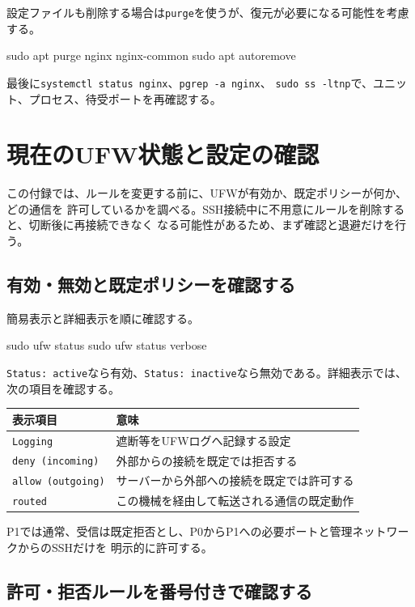 \documentclass[uplatex,a4paper,11pt]{jsarticle}
\begin{document}
設定ファイルも削除する場合は\texttt{purge}を使うが、復元が必要になる可能性を考慮する。

\begin{command}
sudo apt purge nginx nginx-common
sudo apt autoremove
\end{command}

最後に\texttt{systemctl status nginx}、\texttt{pgrep -a nginx}、
\texttt{sudo ss -ltnp}で、ユニット、プロセス、待受ポートを再確認する。

\section{現在のUFW状態と設定の確認}

この付録では、ルールを変更する前に、UFWが有効か、既定ポリシーが何か、どの通信を
許可しているかを調べる。SSH接続中に不用意にルールを削除すると、切断後に再接続できなく
なる可能性があるため、まず確認と退避だけを行う。

\subsection{有効・無効と既定ポリシーを確認する}

簡易表示と詳細表示を順に確認する。

\begin{command}
sudo ufw status
sudo ufw status verbose
\end{command}

\texttt{Status: active}なら有効、\texttt{Status: inactive}なら無効である。詳細表示では、
次の項目を確認する。

\begin{longtable}{@{}p{35mm}p{108mm}@{}}
\toprule
表示項目 & 意味\\
\midrule
\texttt{Logging} & 遮断等をUFWログへ記録する設定\\
\texttt{deny (incoming)} & 外部からの接続を既定では拒否する\\
\texttt{allow (outgoing)} & サーバーから外部への接続を既定では許可する\\
\texttt{routed} & この機械を経由して転送される通信の既定動作\\
\bottomrule
\end{longtable}

P1では通常、受信は既定拒否とし、P0からP1への必要ポートと管理ネットワークからのSSHだけを
明示的に許可する。

\subsection{許可・拒否ルールを番号付きで確認する}
\end{document}
